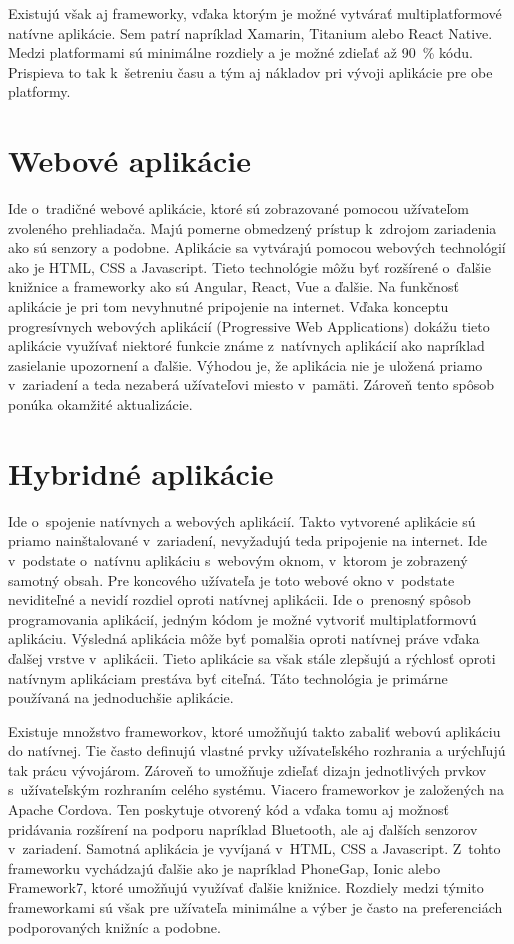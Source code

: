 Existujú však aj frameworky, vďaka ktorým je možné vytvárať multiplatformové natívne aplikácie. Sem patrí napríklad Xamarin, Titanium alebo React Native. Medzi platformami sú minimálne rozdiely a je možné zdieľať až 90~\% kódu. Prispieva to tak k~šetreniu času a tým aj nákladov pri vývoji aplikácie pre obe platformy.\cite{crossplatform-app}

\section{Webové aplikácie}

Ide o~tradičné webové aplikácie, ktoré sú zobrazované pomocou užívateľom zvoleného prehliadača. Majú pomerne obmedzený prístup k~zdrojom zariadenia ako sú senzory a podobne. Aplikácie sa vytvárajú pomocou webových technológií ako je HTML, CSS a Javascript. Tieto technológie môžu byť rozšírené o~ďalšie knižnice a frameworky ako sú Angular, React, Vue a ďalšie. Na funkčnosť aplikácie je pri tom nevyhnutné pripojenie na internet. Vďaka konceptu progresívnych webových aplikácií (Progressive Web Applications) dokážu tieto aplikácie využívať niektoré funkcie známe z~natívnych aplikácií ako napríklad zasielanie upozornení a ďalšie. Výhodou je, že aplikácia nie je uložená priamo v~zariadení a teda nezaberá užívateľovi miesto v~pamäti. Zároveň tento spôsob ponúka okamžité aktualizácie.\cite{hybrid-app} 

\section{Hybridné aplikácie}

Ide o~spojenie natívnych a webových aplikácií. Takto vytvorené aplikácie sú priamo nainštalované v~zariadení, nevyžadujú teda pripojenie na internet. Ide v~podstate o~natívnu aplikáciu s~webovým oknom, v~ktorom je zobrazený samotný obsah. Pre koncového užívateľa je toto webové okno v~podstate neviditeľné a nevidí rozdiel oproti natívnej aplikácii. Ide o~prenosný spôsob programovania aplikácií, jedným kódom je možné vytvoriť multiplatformovú aplikáciu. Výsledná aplikácia môže byť pomalšia oproti natívnej práve vďaka ďalšej vrstve v~aplikácii. Tieto aplikácie sa však stále zlepšujú a rýchlosť oproti natívnym aplikáciam prestáva byť citeľná. Táto technológia je primárne používaná na jednoduchšie aplikácie.\cite{hybrid-app} 

Existuje množstvo frameworkov, ktoré umožňujú takto zabaliť webovú aplikáciu do natívnej. Tie často definujú vlastné prvky užívateľského rozhrania a urýchľujú tak prácu vývojárom. Zároveň to umožňuje zdieľať dizajn jednotlivých prvkov s~užívateľským rozhraním celého systému. Viacero frameworkov je založených na Apache Cordova. Ten poskytuje otvorený kód a vďaka tomu aj možnosť pridávania rozšírení na podporu napríklad Bluetooth, ale aj ďalších senzorov v~zariadení. Samotná aplikácia je vyvíjaná v~HTML, CSS a Javascript. Z~tohto frameworku vychádzajú ďalšie ako je napríklad PhoneGap, Ionic alebo Framework7, ktoré umožňujú využívať ďalšie knižnice. Rozdiely medzi týmito frameworkami sú však pre užívateľa minimálne a výber je často na preferenciách podporovaných knižníc a podobne.\cite{crossplatform-app}


